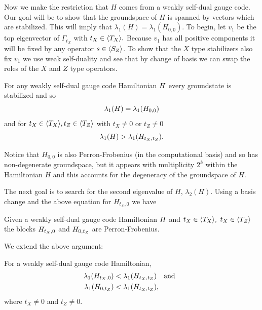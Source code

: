 Now we make the restriction that $H$
comes from a weakly self-dual gauge code.
Our goal will be to show that the
groundspace of $H$ is spanned
by vectors which are stabilized.
This will imply that $\lambda_1(H)=\lambda_1(H_{0,0}).$
To begin, let $v_1$ be the top
eigenvector of $\Gamma_{t_X}$ with $t_X\in\langle T_X \rangle.$
Because $v_1$ has all positive components
it will be fixed by  any operator
$s\in\langle S_Z \rangle$.
To show that the $X$ type stabilizers
also fix $v_1$ 
we use weak self-duality
and see that by change of basis
we can swap the roles of the $X$ and $Z$ type operators.
\begin{framed}

For any weakly self-dual gauge code Hamiltonian $H$
every groundstate is stabilized 
and so $$\lambda_1(H) = \lambda_1(H_{0,0})$$
and for $t_X\in\langle T_X \rangle, t_Z\in\langle T_Z \rangle$
with $t_X\ne 0$ or $t_Z\ne 0$
$$
\lambda_1(H) > \lambda_1(H_{t_X,t_Z}).
$$
\end{framed}
Notice that 
$H_{0,0}$ is also Perron-Frobenius (in the computational basis)
and so has non-degenerate
groundspace, but it appears with multiplicity $2^k$ within
the Hamiltonian $H$ and this accounts for the degeneracy of the
groundspace of $H$.



The next goal is to search for
the second eigenvalue of $H$,
$\lambda_2(H).$
Using a basis change and the
above equation for $H_{t_X,0}$
we have
\begin{framed}
Given a weakly self-dual
gauge code Hamiltonian $H$ and
$t_X\in \langle T_X \rangle,\  t_X\in \langle T_Z \rangle$
the blocks $H_{t_X,0}$ and 
$H_{0,t_Z}$ are Perron-Frobenius.
\end{framed}

We extend the above argument:
\begin{framed}
\noindent For a weakly self-dual gauge code
Hamiltonian,
\begin{align*}
\lambda_1(H_{t_X,0}) &< 
    \lambda_1(H_{t_X,t_Z}) \ \ \ \mbox{and}\ \ \\
\lambda_1(H_{0,t_Z}) &< 
    \lambda_1(H_{t_X,t_Z}),
\end{align*}
where $t_X\ne 0$ and $t_Z\ne 0.$
\end{framed}

